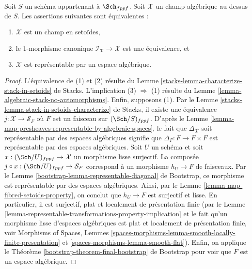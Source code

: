 \begin{proposition}
\label{proposition-algebraic-stack-no-automorphisms}
Soit $S$ un schéma appartenant à $\Sch_{fppf}$.
Soit $\mathcal{X}$ un champ algébrique au-dessus de $S$.
Les assertions suivantes sont équivalentes :
\begin{enumerate}
\item $\mathcal{X}$ est un champ en setoïdes,
\item le $1$-morphisme canonique $\mathcal{I}_\mathcal{X} \to \mathcal{X}$
est une équivalence, et
\item $\mathcal{X}$ est représentable par un espace algébrique.
\end{enumerate}
\end{proposition}

\begin{proof}
L'équivalence de (1) et (2) résulte du
Lemme \ref{stacks-lemma-characterize-stack-in-setoids} de Stacks.
L'implication (3) $\Rightarrow$ (1) résulte du
Lemme \ref{lemma-algebraic-stack-no-automorphisms}.
Enfin, supposons (1). Par le
Lemme \ref{stacks-lemma-stack-in-setoids-characterize} de Stacks,
il existe une équivalence $j : \mathcal{X} \to \mathcal{S}_F$
où $F$ est un faisceau sur $(\Sch/S)_{fppf}$.  D'après le
Lemme \ref{lemma-map-presheaves-representable-by-algebraic-spaces},
le fait que $\Delta_\mathcal{X}$ soit représentable par des espaces
algébriques signifie que $\Delta_F : F \to F \times F$
est représentable par des espaces algébriques.
Soit $U$ un schéma et soit $x : (\Sch/U)_{fppf} \to \mathcal{X}$
un morphisme lisse surjectif. La composée
$j \circ x : (\Sch/U)_{fppf} \to \mathcal{S}_F$
correspond à un morphisme $h_U \to F$ de faisceaux. Par le
Lemme \ref{bootstrap-lemma-representable-diagonal} de Bootstrap,
ce morphisme est représentable par des espaces algébriques.
Ainsi, par le
Lemme \ref{lemma-map-fibred-setoids-property},
on conclut que $h_U \to F$ est surjectif et lisse.
En particulier, il est surjectif, plat et localement de présentation finie
(par le
Lemme \ref{lemma-representable-transformations-property-implication}
et le fait qu'un morphisme lisse d'espaces algébriques est plat et
localement de présentation finie, voir
Morphisms of Spaces,
Lemmes \ref{spaces-morphisms-lemma-smooth-locally-finite-presentation} et
\ref{spaces-morphisms-lemma-smooth-flat}).
Enfin, on applique le
Théorème \ref{bootstrap-theorem-final-bootstrap} de Bootstrap
pour voir que $F$ est un espace algébrique.
\end{proof}







